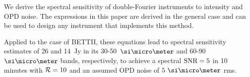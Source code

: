 We derive the spectral sensitivity of double-Fourier instruments to intensity and OPD noise. The expressions in this paper are derived in the general case and can be used to design any instrument that implements this method.

Applied to the case of BETTII, these equations lead to spectral sensitivity estimates of 26 and 14~Jy in its 30-50~$\um$ and 60-90~$\um$ bands, respectively, to achieve a spectral $\textrm{SNR}=5$ in 10 minutes with $\mathcal{R}=10$ and an assumed OPD noise of $5~\um$ rms.




%
%
%
%





